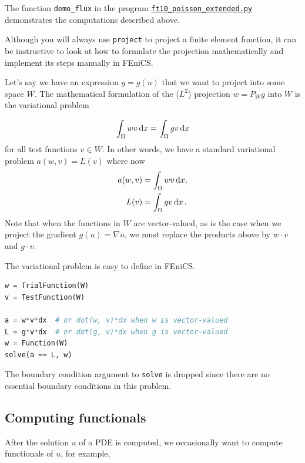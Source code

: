 \documentclass[graybox,envcountchap,sectrefs,final]{svmonodo}
\newenvironment{notice_mdfboxadmon}[1][]{
\begin{notice_mdfboxmdframed}[frametitle=#1]
}
{
\end{notice_mdfboxmdframed}
}
\begin{document}
The function \Verb!demo_flux! in the program
\href{{https://fenicsproject.org/pub/tutorial/python/vol1/ft10_poisson_extended.py}}{\nolinkurl{ft10_poisson_extended.py}}
demonstrates the computations described above.


\begin{notice_mdfboxadmon}
Although you will always use \texttt{project} to project a finite element
function, it can be instructive to look at how to formulate the
projection mathematically and implement its steps manually in FEniCS.

Let's say we have an expression $g = g(u)$ that we want to project
into some space $W$. The mathematical formulation of the ($L^2$)
projection $w = P_W g$ into $W$ is the variational problem

\begin{equation}
  \int_{\Omega} w v \dx = \int_{\Omega} g v \dx
\end{equation}
for all test functions $v\in W$. In other words, we have a
standard variational problem $a(w, v) = L(v)$ where now
\begin{align}
a(w, v) &= \int_\Omega w v \dx,\\
L(v) &= \int_\Omega g v \dx\tp
\end{align}
Note that when the functions in $W$ are vector-valued, as is the case
when we project the gradient $g(u) = \nabla u$, we must replace the
products above by $w\cdot v$ and $g\cdot v$.

The variational problem is easy to define in FEniCS.
\begin{lstlisting}[language=Python,style=graycolor]
w = TrialFunction(W)
v = TestFunction(W)

a = w*v*dx  # or dot(w, v)*dx when w is vector-valued
L = g*v*dx  # or dot(g, v)*dx when g is vector-valued
w = Function(W)
solve(a == L, w)
\end{lstlisting}
The boundary condition argument to \texttt{solve} is dropped since there are
no essential boundary conditions in this problem.
\end{notice_mdfboxadmon} %



\subsection{Computing functionals}
\label{ch:poisson0:functionals}

After the solution $u$ of a PDE is computed, we occasionally want to compute
functionals of $u$, for example,
\end{document}
